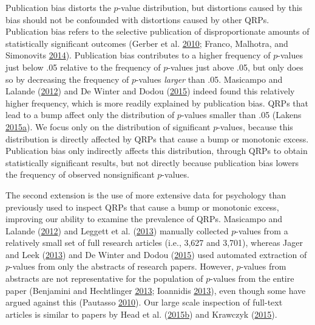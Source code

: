 \documentclass[a5paper]{book}
\begin{document}
Publication bias distorts the \(p\)-value distribution, but distortions
caused by this bias should not be confounded with distortions caused by
other QRPs. Publication bias refers to the selective publication of
disproportionate amounts of statistically significant outcomes (Gerber
et al. \protect\hyperlink{ref-doi:10.1177ux2f1532673x09350979}{2010};
Franco, Malhotra, and Simonovits
\protect\hyperlink{ref-doi:10.1126ux2fscience.1255484}{2014}).
Publication bias contributes to a higher frequency of \(p\)-values just
below .05 relative to the frequency of \(p\)-values just above .05, but
only does so by decreasing the frequency of \(p\)-values \emph{larger}
than .05. Masicampo and Lalande
(\protect\hyperlink{ref-doi:10.1080ux2f17470218.2012.711335}{2012}) and
De Winter and Dodou
(\protect\hyperlink{ref-doi:10.7717ux2fpeerj.733}{2015}) indeed found
this relatively higher frequency, which is more readily explained by
publication bias. QRPs that lead to a bump affect only the distribution
of \(p\)-values smaller than .05 (Lakens
\protect\hyperlink{ref-doi:10.1080ux2f17470218.2014.982664}{2015}\protect\hyperlink{ref-doi:10.1080ux2f17470218.2014.982664}{a}).
We focus only on the distribution of significant \(p\)-values, because
this distribution is directly affected by QRPs that cause a bump or
monotonic excess. Publication bias only indirectly affects this
distribution, through QRPs to obtain statistically significant results,
but not directly because publication bias lowers the frequency of
observed nonsignificant \(p\)-values.

The second extension is the use of more extensive data for psychology
than previously used to inspect QRPs that cause a bump or monotonic
excess, improving our ability to examine the prevalence of QRPs.
Masicampo and Lalande
(\protect\hyperlink{ref-doi:10.1080ux2f17470218.2012.711335}{2012}) and
Leggett et al.
(\protect\hyperlink{ref-doi:10.1080ux2f17470218.2013.863371}{2013})
manually collected \(p\)-values from a relatively small set of full
research articles (i.e., 3,627 and 3,701), whereas Jager and Leek
(\protect\hyperlink{ref-doi:10.1093ux2fbiostatisticsux2fkxt007}{2013})
and De Winter and Dodou
(\protect\hyperlink{ref-doi:10.7717ux2fpeerj.733}{2015}) used automated
extraction of \(p\)-values from only the abstracts of research papers.
However, \(p\)-values from abstracts are not representative for the
population of \(p\)-values from the entire paper (Benjamini and
Hechtlinger
\protect\hyperlink{ref-doi:10.1093ux2fbiostatisticsux2fkxt032}{2013};
Ioannidis
\protect\hyperlink{ref-doi:10.1093ux2fbiostatisticsux2fkxt036}{2013}),
even though some have argued against this (Pautasso
\protect\hyperlink{ref-doi:10.1007ux2fs11192-010-0233-5}{2010}). Our
large scale inspection of full-text articles is similar to papers by
Head et al.
(\protect\hyperlink{ref-doi:10.1371ux2fjournal.pbio.1002106}{2015}\protect\hyperlink{ref-doi:10.1371ux2fjournal.pbio.1002106}{b})
and Krawczyk
(\protect\hyperlink{ref-doi:10.1371ux2fjournal.pone.0127872}{2015}).
\end{document}
